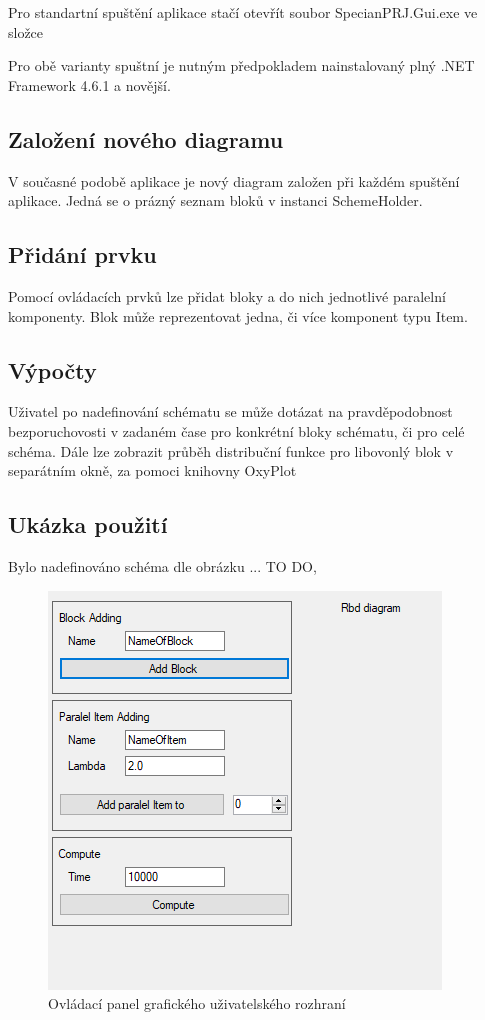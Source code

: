 \documentclass[FM,RP]{tulthesis}
\begin{document}
    Pro standartní spuštění aplikace stačí otevřít soubor SpecianPRJ.Gui.exe ve složce 

    Pro obě varianty spuštní je nutným předpokladem nainstalovaný plný .NET Framework 4.6.1 a novější. 

    \subsection*{Založení nového diagramu}
        V současné podobě aplikace je nový diagram založen při každém spuštění aplikace. Jedná se o prázný seznam bloků v instanci SchemeHolder.
    \subsection*{Přidání prvku}
        Pomocí ovládacích prvků lze přidat bloky a do nich jednotlivé paralelní komponenty. 
        Blok může reprezentovat jedna, či více komponent typu Item.
    \subsection*{Výpočty}
        Uživatel po nadefinování schématu se může dotázat na pravděpodobnost bezporuchovosti v zadaném čase pro konkrétní bloky schématu, či pro celé schéma.
        Dále lze zobrazit průběh distribuční funkce pro libovonlý blok v separátním okně, za pomoci knihovny OxyPlot \cite{15}
    \subsection*{Ukázka použití}
    Bylo nadefinováno schéma dle obrázku ... TO DO, 
    \begin{figure}[h]
        \centering
        \includegraphics[scale=1]{pic/gui.png}
        \caption{Ovládací panel grafického uživatelského rozhraní} 
    \end{figure}
\end{document}
